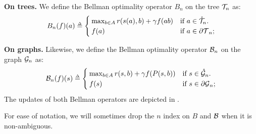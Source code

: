 \begin{definition}
	\begin{leftbar}[defnbar]
	\label{def:bellman}
	{\textbf{On trees.}} We define the Bellman optimality operator $B_n$ on the tree $\mathcal{T}_n$ as:
	\begin{equation}
	\label{eq:bellman-tree}
	B_n(f)(a) \eqdef \begin{cases}
	\max_{b\in A} r(s(a), b) + \gamma f({ab})
	& \text{if $a\in\inte{\Tau}_n$.} \\
	f(a) & \text{if $a\in\ext{\Tau}_n$;}
	\end{cases}
	\end{equation}
	
	{\textbf{On graphs.}} Likewise, we define the Bellman optimality operator $\mathcal{B}_n$ on the graph $\mathcal{G}_n$ as:
	\begin{equation}
	\label{eq:bellman-graph}
	\cB_n(f)(s) \eqdef \begin{cases}
	\max_{b\in A} r(s, b) + \gamma f(P(s,b))
	& \text{if $s\in\inte{\cG}_n$.} \\
	f(s) & \text{if $s\in\ext{\cG}_n$;}
	\end{cases}
	\end{equation}
	The updates of both Bellman operators are depicted in .
	\end{leftbar}
\end{definition}

\begin{remark}
	\begin{leftbar}[remarkbar]
	For ease of notation, we will sometimes drop the $n$ index on $B$ and $\mathcal{B}$ when it is non-ambiguous.
	\end{leftbar}
\end{remark}



